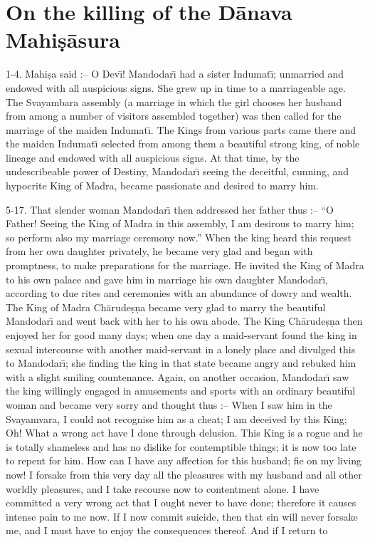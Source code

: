 \chapter{On the killing of the D\=anava Mahi\d{s}\=asura}

1-4. Mahi\d{s}a said :-- O Dev\={\i}! Mandodar\={\i} had a sister Indumat\={\i}; unmarried and endowed with all auspicious signs. She grew up in time to a marriageable age. The Svayambara assembly (a marriage in which the girl chooses her husband from among a number of visitors assembled together) was then called for the marriage of the maiden Indumat\={\i}. The Kings from various parts came there and the maiden Indumat\={\i} selected from among them a beautiful strong king, of noble lineage and endowed with all auspicious signs. At that time, by the undescribeable power of Destiny, Mandodar\={\i} seeing the deceitful, cunning, and hypocrite King of Madra, became passionate and desired to marry him.

5-17. That slender woman Mandodar\={\i} then addressed her father thus :-- ``O Father! Seeing the King of Madra in this assembly, I am desirous to marry him; so perform also my marriage ceremony now.'' When the king heard this request from her own daughter privately, he became very glad and began with promptness, to make preparations for the marriage. He invited the King of Madra to his own palace and gave him in marriage his own daughter Mandodar\={\i}, according to due rites and ceremonies with an abundance of dowry and wealth. The King of Madra Ch\=arude\d{s}\d{n}a became very glad to marry the beautiful Mandodar\={\i} and went back with her to his own abode. The King Ch\=arude\d{s}\d{n}a then enjoyed her for good many days; when one day a maid-servant found the king in sexual intercourse with another maid-servant in a lonely place and divulged this to Mandodar\={\i}; she finding the king in that state became angry and rebuked him with a slight smiling countenance. Again, on another occasion, Mandodar\={\i} saw the king willingly engaged in amusements and sports with an ordinary beautiful woman and became very sorry and thought thus :-- When I saw him in the Svayamvara, I could not recognise him as a cheat; I am deceived by this King; Oh! What a wrong act have I done through delusion. This King is a rogue and he is totally shameless and has no dislike for contemptible things; it is now too late to repent for him. How can I have any affection for this husband; fie on my living now! I forsake from this very day all the pleasures with my husband and all other worldly pleasures, and I take recourse now to contentment alone. I have committed a very wrong act that I ought never to have done; therefore it causes intense pain to me now. If I now commit suicide, then that sin will never forsake me, and I must have to enjoy the consequences thereof. And if I return to

